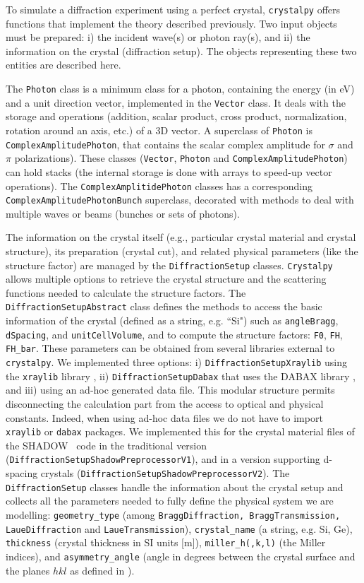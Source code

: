 \documentclass{iucr}
\begin{document}
To simulate a diffraction experiment using a perfect crystal, {\tt crystalpy}  offers functions that implement the theory described previously. Two input objects must be prepared: i) the incident wave(s) or  photon ray(s), and ii) the information on the crystal (diffraction setup). The objects representing these two entities are described here. 

The {\tt Photon} class is a minimum class for a photon, containing the energy (in eV) and a unit direction vector, implemented in 
the {\tt Vector} class. It deals with the storage and operations (addition, scalar product, cross product, normalization, rotation around an axis, etc.) of a 3D vector. A superclass of {\tt Photon} is {\tt ComplexAmplitudePhoton}, that contains the scalar complex amplitude for $\sigma$ and $\pi$ polarizations). 
These classes ({\tt Vector}, {\tt Photon} and {\tt ComplexAmplitudePhoton}) can hold stacks (the internal storage is done with arrays to speed-up vector operations). The {\tt ComplexAmplitidePhoton} classes 
has a corresponding {\tt ComplexAmplitudePhotonBunch} superclass, decorated with methods to deal with multiple waves or beams (bunches or sets of photons). 

The information on the crystal itself (e.g., particular crystal material and crystal structure), its preparation (crystal cut), and related physical parameters (like the structure factor) are managed by the {\tt DiffractionSetup} classes. {\tt Crystalpy} allows multiple options to retrieve the crystal structure and the scattering functions needed to calculate the structure factors. 
The {\tt DiffractionSetupAbstract} class defines the methods to access the basic information of the crystal (defined as a string, e.g. ``Si") such as {\tt angleBragg}, {\tt dSpacing}, and {\tt unitCellVolume}, and to compute the structure factors: {\tt F0}, {\tt FH}, {\tt FH\_bar}. These parameters can be obtained from several libraries external to {\tt crystalpy}. We implemented three options: i) {\tt DiffractionSetupXraylib} using the {\tt xraylib} library \cite{xraylib}, ii) {\tt DiffractionSetupDabax} that uses the DABAX library \cite{dabax}, and iii) using an ad-hoc generated data file. This modular structure permits disconnecting the calculation part from the access to optical and physical constants. Indeed, when using ad-hoc data files we do not have to import {\tt xraylib} or {\tt dabax} packages. We implemented this for the crystal material files of the SHADOW~\cite{codeSHADOW} code in the traditional version ({\tt DiffractionSetupShadowPreprocessorV1}), and in
a version supporting 
d-spacing crystals ({\tt DiffractionSetupShadowPreprocessorV2}).
The {\tt DiffractionSetup} classes handle the information about the crystal setup and collects all the parameters needed to fully define the physical system we are modelling:
{\tt geometry\_type} (among {\tt BraggDiffraction, BraggTransmission, LaueDiffraction} and {\tt LaueTransmission}),
{\tt crystal\_name} (a string, e.g. Si, Ge),
{\tt thickness} (crystal thickness in SI units [m]),
{\tt miller\_h(,k,l)} (the Miller indices),
and {\tt asymmetry\_angle} (angle in degrees between the crystal surface and the planes $hkl$ as defined in \cite{codeCRYSTAL}).
\end{document}
